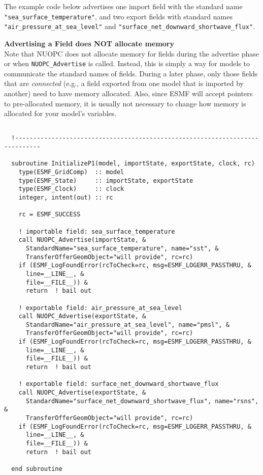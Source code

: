    The example code below advertises one import field with the standard
   name {\tt "sea\_surface\_temperature"}, and two export fields with standard
   names {\tt "air\_pressure\_at\_sea\_level"} and {\tt "surface\_net\_downward\_shortwave\_flux"}.
  
   \textbf{Advertising a Field does NOT allocate memory}
   \\
   Note that NUOPC does not allocate memory for fields during the
   advertise phase or when {\tt NUOPC\_Advertise} is called.
   Instead, this is simply a way for models to communicate the
   standard names of fields.  During a later phase, only those fields that
   are \emph{connected} (e.g., a field exported from one model that is
   imported by another) need to have memory allocated.
   Also, since ESMF will accept pointers to pre-allocated memory, it is usually not
   necessary to change how memory is allocated for your model's variables.
  

 \begin{verbatim}
  
  !-----------------------------------------------------------------------------

  subroutine InitializeP1(model, importState, exportState, clock, rc)
    type(ESMF_GridComp)  :: model
    type(ESMF_State)     :: importState, exportState
    type(ESMF_Clock)     :: clock
    integer, intent(out) :: rc
    
    rc = ESMF_SUCCESS
    
    ! importable field: sea_surface_temperature
    call NUOPC_Advertise(importState, &
      StandardName="sea_surface_temperature", name="sst", & 
      TransferOfferGeomObject="will provide", rc=rc)
    if (ESMF_LogFoundError(rcToCheck=rc, msg=ESMF_LOGERR_PASSTHRU, &
      line=__LINE__, &
      file=__FILE__)) &
      return  ! bail out
    
    ! exportable field: air_pressure_at_sea_level
    call NUOPC_Advertise(exportState, &
      StandardName="air_pressure_at_sea_level", name="pmsl", & 
      TransferOfferGeomObject="will provide", rc=rc)
    if (ESMF_LogFoundError(rcToCheck=rc, msg=ESMF_LOGERR_PASSTHRU, &
      line=__LINE__, &
      file=__FILE__)) &
      return  ! bail out
    
    ! exportable field: surface_net_downward_shortwave_flux
    call NUOPC_Advertise(exportState, &
      StandardName="surface_net_downward_shortwave_flux", name="rsns", & 
      TransferOfferGeomObject="will provide", rc=rc)
    if (ESMF_LogFoundError(rcToCheck=rc, msg=ESMF_LOGERR_PASSTHRU, &
      line=__LINE__, &
      file=__FILE__)) &
      return  ! bail out

  end subroutine
  
 
\end{verbatim}
 
